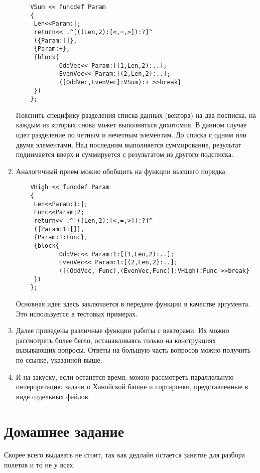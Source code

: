 \begin{enumerate}
   \begin{verbatim}
    VSum << funcdef Param
    {
     Len<<Param:|;
     return<< .^[((Len,2):[<,=,>]):?]^
     ({Param:[]},
     {Param:+},
     {block{
            OddVec<< Param:[(1,Len,2):..];
            EvenVec<< Param:[(2,Len,2):..];
            ([OddVec,EvenVec]:VSum):+ >>break}
     })
    };
   \end{verbatim}
   Пояснить специфику разделения списка данных (вектора) на два посписка, на каждым из которых снова может выполняться дихотомия. В данном случае идет разделение по четным и нечетным элементам. До списка с одним или двумя элементами. Над последним выполняется суммирование, результат поднимается вверх и суммируется с результатом из другого подсписка.
   \item Аналогичный прием можно обобщить на функции высшего порядка.
   \begin{verbatim}
    VHigh << funcdef Param
    {
     Len<<Param:1:|;
     Func<<Param:2;
     return<< .^[((Len,2):[<,=,>]):?]^
     ({Param:1:[]},
     {Param:1:Func},
     {block{
            OddVec<< Param:1:[(1,Len,2):..];
            EvenVec<< Param:1:[(2,Len,2):..];
            ([(OddVec, Func),(EvenVec,Func)]:VHigh):Func >>break}
     })
    };
    \end{verbatim}
    Основная идея здесь заключается в передаче функции в качестве аргумента. Это используется в тестовых примерах.
    \item Далее приведены различные функции работы с векторами. Их можно рассмотреть более бегло, останавливаясь только на конструкциях вызывающих вопросы. Ответы на большую часть вопросов можно получить по ссылке, указанной выше.
    \item И на закуску, если останется время, можно рассмотреть параллельную интерпретацию задачи о Ханойской башне и сортировки, представленные в виде отдельных файлов.
\end{enumerate}

\section{Домашнее задание}

Скорее всего выдавать не стоит, так как дедлайн остается занятие для разбора полетов и то не у всех.
